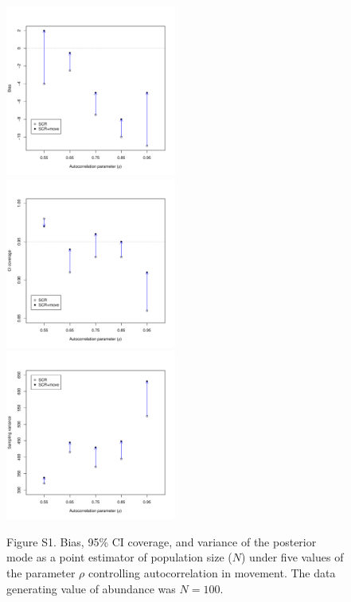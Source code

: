 \documentclass[12pt]{article}
\begin{document}
\begin{figure}[h!]
  \centering
  \includegraphics[width=0.5\textwidth, trim=0mm 15mm 0mm 15mm, clip]{../R/sims/bias-N.pdf} \\
  \includegraphics[width=0.5\textwidth, trim=0mm 15mm 0mm 15mm, clip]{../R/sims/cover-N.pdf} \\
  \includegraphics[width=0.5\textwidth, trim=0mm 0mm 0mm 15mm, clip]{../R/sims/var-N.pdf}
  \caption{Figure S1. Bias, 95\% CI coverage, and variance of the posterior mode
    as a point estimator of population size ($N$) under five values of
    the parameter $\rho$ controlling autocorrelation in movement. The
    data generating value of abundance was $N=100$. } 
  \label{fig:bias}
\end{figure}
\end{document}
